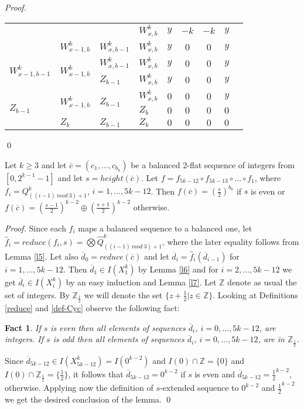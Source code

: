 \documentclass{llncs}
\newtheorem{fact}[theorem]{Fact}
\begin{document}
\begin{proof}
\begin{center}
\begin{tabular}{|*{4}{|l}|*{4}{|c}||c||}
 & & & $W^k_{x,b}$ & $y$ & $-k$ & $-k$ & $y$ &   \\ 
 & $W^k_{x-1,b}$ & $W^k_{x,b-1}$ & $W^k_{x,b}$ & 
      $y$ & $0$ & $0$ & $y$ &   \\ 
  &  
      & $W^k_{x,b-1}$ & $W^k_{x,b}$ & $y$ & $0$ & $0$ & $y$ &   \\ 
 & & $Z_{b-1}$ & $W^k_{x,b}$ & $y$ & $0$ & $0$ & $y$ & \\ 
  &  & 
       & $W^k_{x,b}$ & $0$ & $0$ & $0$ & $y$ &  \\ 
 & & & $Z_{b}$ & $0$ & $0$ & $0$ & $0$ &  \\ 
 & $Z_{b}$ & $Z_{b-1}$ & $Z_{b}$ & $0$ & $0$ & $0$ & $0$ &  \\ 
\hline\hline 
\end{tabular}
\end{center} \qed
\end{proof}

\begin{lemma}
Let $k\ge 3$ and let $\overline{c} = (c_1,\ldots,c_{b_k})$ be a balanced
2-flat sequence of integers from $[0,2^{k-1}-1]$ and let
$s=height(\overline{c})$. Let $f = f_{5k-12}\circ f_{5k-13}\circ \ldots\circ
f_1$, where $f_i = Q^k_{((i-1)~mod~3)+1}$, $i=1,\ldots,5k-12$. Then 
$f(\overline{c})
= (\frac{s}{2})^{b_k}$ if $s$ is even or $f(\overline{c}) =
(\frac{s-1}{2})^{k-2}\oplus(\frac{s+1}{2})^{k-2}$ otherwise.
\end{lemma}
\begin{proof}
Since each $f_i$ maps a balanced sequence to a balanced one, let $\hat{f}_i
= reduce(f_i,s) = \bigotimes\hat{Q}^k_{((i-1)~mod~3)+1}$, where the later
equality follows from Lemma \ref{l5}. Let also $\overline{d}_0 =
reduce(\overline{c})$ and let $\overline{d}_i = \hat{f}_i(\overline{d}_{i-1})$
for $i=1,\ldots,5k-12$. Then $\overline{d}_1\in I(X^k_1)$ by Lemma \ref{l6}
and for $i=2,\ldots,5k-12$ we get $\overline{d}_i\in I(X^k_i)$ by an easy
induction and Lemma \ref{l7}. Let $\mathbb{Z}$ denote as usual the set of 
integers. By $\mathbb{Z}_{\frac{1}{2}}$ we will denote the set 
$\{z+\frac{1}{2}| z\in\mathbb{Z}\}$. Looking at Definitions \ref{reduce} and 
\ref{def-Cyc} observe the 
following fact:
\begin{fact}
If $s$ is even then all elements of sequences $\overline{d}_i$, $i=0,\ldots, 
5k-12$, are integers. If $s$ is odd then  all elements of sequences 
$\overline{d}_i$, $i=0,\ldots, 5k-12$, are in $\mathbb{Z}_{\frac{1}{2}}$.
\end{fact}
Since $\overline{d}_{5k-12} \in I(X^k_{5k-12}) = I(0^{k-2})$ and $I(0)\cap 
\mathbb{Z} = \{0\}$ and $I(0)\cap \mathbb{Z}_{\frac{1}{2}} = 
\{\frac{1}{2}\}$, it follows that $\overline{d}_{5k-12} = 0^{k-2}$ if $s$ is 
even and  $\overline{d}_{5k-12} = \frac{1}{2}^{k-2}$, otherwise. Applying now 
the definition of $s$-extended sequence to $0^{k-2}$ and $\frac{1}{2}^{k-2}$ 
we get the desired conclusion of the lemma. \qed
\end{proof}
\end{document}
